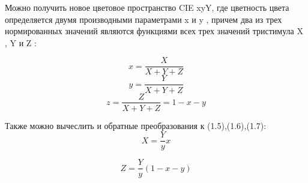 \begin{figure}[ht!]
\end{figure}

Можно получить новое цветовое пространство  CIE  xyY, где цветность цвета определяется двумя производными параметрами x и y , причем два из трех нормированных значений являются функциями всех трех значений тристимула X , Y и Z :


\begin{equation}
x = \frac{X}{X+Y+Z} 
\end{equation} 
\begin{equation}
y = \frac{Y}{X+Y+Z} 
\end{equation}
\begin{equation}
z = \frac{Z}{X+Y+Z} = 1 - x - y 
\end{equation}

Также можно вычеслить и обратные преобразования к (1.5),(1.6),(1.7):
\begin{equation}
X = \frac{Y}{y} x 
\end{equation} 

\begin{equation}
Z = \frac{Y}{y}(1 - x - y)
\end{equation} 

